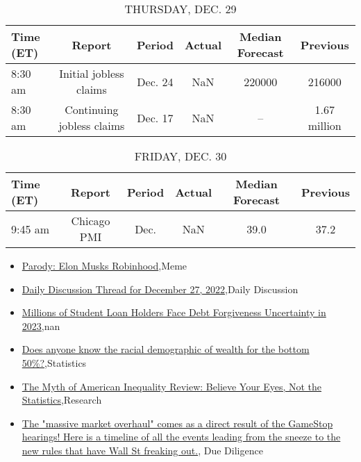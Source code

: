 \documentclass{article}%
\begin{document}
%


\begin{table}[htbp]%
\caption{THURSDAY, DEC. 29}%
\centering%
\begin{adjustbox}{width=1\textwidth}%
\begin{tabular}{lccccc}
\toprule
Time (ET) &                    Report &  Period & Actual & Median Forecast &     Previous \\
\midrule
  8:30 am &    Initial jobless claims & Dec. 24 &    NaN &          220000 &       216000 \\
  8:30 am & Continuing jobless claims & Dec. 17 &    NaN &              -- & 1.67 million \\
\bottomrule
\end{tabular}
%
\end{adjustbox}%
\end{table}

%


\begin{table}[htbp]%
\caption{FRIDAY, DEC. 30}%
\centering%
\begin{adjustbox}{width=1\textwidth}%
\begin{tabular}{lccccc}
\toprule
Time (ET) &      Report & Period & Actual & Median Forecast & Previous \\
\midrule
  9:45 am & Chicago PMI &   Dec. &    NaN &            39.0 &     37.2 \\
\bottomrule
\end{tabular}
%
\end{adjustbox}%
\end{table}

%
\begin{itemize}%
\item%
\href{https://reddit.com/r/wallstreetbets/comments/zwdui9/parody\_elon\_musks\_robinhood/}{Parody: Elon Musks Robinhood},Meme%
\item%
\href{https://reddit.com/r/wallstreetbets/comments/zwd37x/daily\_discussion\_thread\_for\_december\_27\_2022/}{Daily Discussion Thread for December 27, 2022},Daily Discussion%
\item%
\href{https://reddit.com/r/Economics/comments/zw82vy/millions\_of\_student\_loan\_holders\_face\_debt/}{Millions of Student Loan Holders Face Debt Forgiveness Uncertainty in 2023},nan%
\item%
\href{https://reddit.com/r/Economics/comments/zw4dyf/does\_anyone\_know\_the\_racial\_demographic\_of\_wealth/}{Does anyone know the racial demographic of wealth for the bottom 50\%?},Statistics%
\item%
\href{https://reddit.com/r/Economics/comments/zw4196/the\_myth\_of\_american\_inequality\_review\_believe/}{The Myth of American Inequality Review: Believe Your Eyes, Not the Statistics},Research%
\item%
\href{https://reddit.com/r/Superstonk/comments/zwdmgy/the\_massive\_market\_overhaul\_comes\_as\_a\_direct/}{The "massive market overhaul" comes as a direct result of the GameStop hearings! Here is a timeline of all the events leading from the sneeze to the new rules that have Wall St freaking out.}, Due Diligence%
\end{itemize}%
\end{document}
